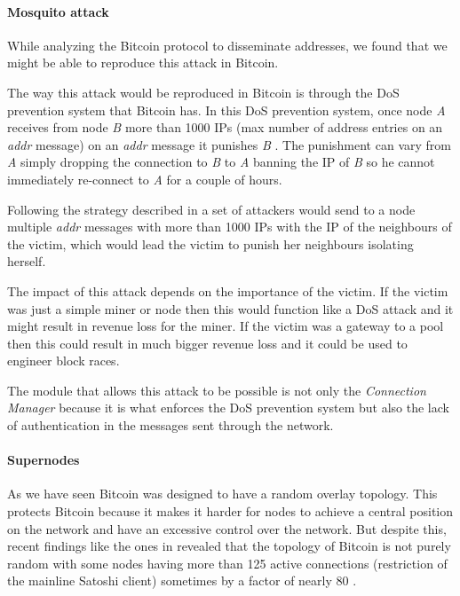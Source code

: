 \paragraph*{\textbf{Mosquito attack}} While analyzing the Bitcoin protocol to disseminate addresses, we found that we might be able to reproduce this attack in Bitcoin.

The way this attack would be reproduced in Bitcoin is through the DoS prevention system that Bitcoin has. In this DoS prevention system, once node \textit{A} receives from node \textit{B} more than 1000 IPs (max number of address entries on an \textit{addr} message) on an \textit{addr} message it punishes \textit{B} \cite{bitcoinwiki}. The punishment can vary from \textit{A} simply dropping the connection to \textit{B} to \textit{A} banning the IP of \textit{B} so he cannot immediately re-connect to \textit{A} for a couple of hours.

Following the strategy described in \cite{jesi2009secure} a set of attackers would send to a node multiple \textit{addr} messages with more than 1000 IPs with the IP of the neighbours of the victim, which would lead the victim to punish her neighbours isolating herself.

The impact of this attack depends on the importance of the victim. If the victim was just a simple miner or node then this would function like a DoS attack and it might result in revenue loss for the miner. If the victim was a gateway to a pool then this could result in much bigger revenue loss and it could be used to engineer block races.

The module that allows this attack to be possible is not only the \textit{Connection Manager} because it is what enforces the DoS prevention system but also the lack of authentication in the messages sent through the network.

\paragraph*{\textbf{Supernodes}} As we have seen Bitcoin was designed to have a random overlay topology. This protects Bitcoin because it makes it harder for nodes to achieve a central position on the network and have an excessive control over the network. But despite this, recent findings like the ones in \cite{miller2015discovering} revealed that the topology of Bitcoin is not purely random with some nodes having more than 125 active connections (restriction of the mainline Satoshi client) sometimes by a factor of nearly 80 \cite{miller2015discovering}.

